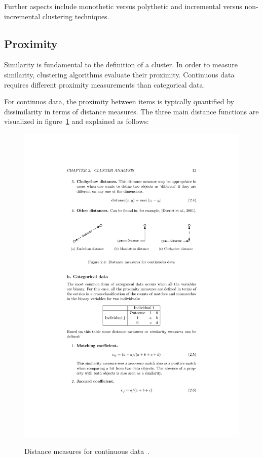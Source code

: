Further aspects include monothetic versus polythetic and incremental versus non-incremental clustering techniques. 



\subsection{Proximity}
\label{chapter:proximity}

Similarity is fundamental to the definition of a cluster. In order to measure similarity, clustering algorithms evaluate their proximity. Continuous data requires different proximity measurements than categorical data.

For continuos data, the proximity between items is typically quantified by dissimilarity in terms of distance measures. The three main distance functions are visualized in figure~\ref{fig:clustering-proximity} and explained as follows\cite{Meert06clustermaps}:

\begin{figure}[h]
  \begin{center}
    \includegraphics[width=1\textwidth]{figures/clustering_proximity.pdf}
    \label{fig:clustering-proximity}
    \caption{Distance measures for continuous data~\cite[p 12]{Meert06clustermaps}.}
  \end{center}
\end{figure}

